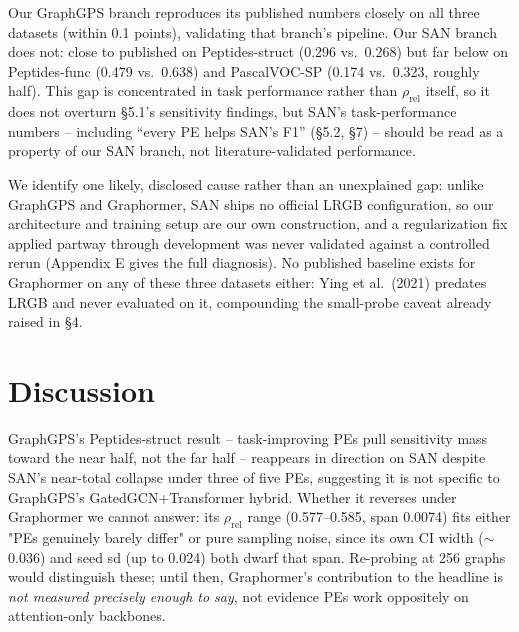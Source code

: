 \documentclass[10pt]{article}
\begin{document}
Our GraphGPS branch reproduces its published numbers closely on all three datasets (within 0.1 points), validating that branch's pipeline. Our SAN branch does not: close to published on Peptides-struct (0.296 vs.\ 0.268) but far below on Peptides-func (0.479 vs.\ 0.638) and PascalVOC-SP (0.174 vs.\ 0.323, roughly half). This gap is concentrated in task performance rather than $\rho_{\text{rel}}$ itself, so it does not overturn \S5.1's sensitivity findings, but SAN's task-performance numbers -- including ``every PE helps SAN's F1'' (\S5.2, \S7) -- should be read as a property of our SAN branch, not literature-validated performance.

We identify one likely, disclosed cause rather than an unexplained gap: unlike GraphGPS and Graphormer, SAN ships no official LRGB configuration, so our architecture and training setup are our own construction, and a regularization fix applied partway through development was never validated against a controlled rerun (Appendix E gives the full diagnosis). No published baseline exists for Graphormer on any of these three datasets either: Ying et al.\ (2021) predates LRGB and never evaluated on it, compounding the small-probe caveat already raised in \S4.

\section{Discussion}
GraphGPS's Peptides-struct result -- task-improving PEs pull sensitivity mass toward the near half, not the far half -- reappears in direction on SAN despite SAN's near-total collapse under three of five PEs, suggesting it is not specific to GraphGPS's GatedGCN+Transformer hybrid. Whether it reverses under Graphormer we cannot answer: its $\rho_{\text{rel}}$ range (0.577--0.585, span 0.0074) fits either "PEs genuinely barely differ" or pure sampling noise, since its own CI width ($\sim$0.036) and seed sd (up to 0.024) both dwarf that span. Re-probing at 256 graphs would distinguish these; until then, Graphormer's contribution to the headline is \emph{not measured precisely enough to say}, not evidence PEs work oppositely on attention-only backbones.
\end{document}
